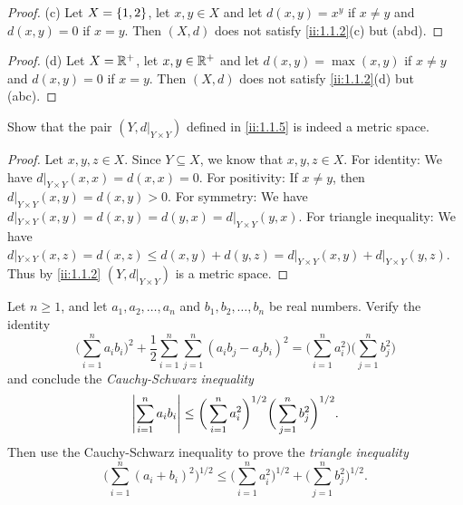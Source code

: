 \begin{proof}{(c)}
  Let \(X = \left\lbrace1, 2\right\rbrace\), let \(x, y \in X\) and let \(d(x, y) = x^y\) if \(x \neq y\) and \(d(x, y) = 0\) if \(x = y\).
  Then \((X, d)\) does not satisfy \cref{ii:1.1.2}(c) but (abd).
\end{proof}

\begin{proof}{(d)}
  Let \(X = \mathbb{R}^+\), let \(x, y \in \mathbb{R}^+\) and let \(d(x, y) = \max(x, y)\) if \(x \neq y\) and \(d(x, y) = 0\) if \(x = y\).
  Then \((X, d)\) does not satisfy \cref{ii:1.1.2}(d) but (abc).
\end{proof}

\begin{ex}\label{ii:ex:1.1.4}
  Show that the pair \((Y, d|_{Y \times Y})\) defined in \cref{ii:1.1.5} is indeed a metric space.
\end{ex}

\begin{proof}
  Let \(x, y, z \in X\).
  Since \(Y \subseteq X\), we know that \(x, y, z \in X\).
  For identity:
  We have \(d|_{Y \times Y}(x, x) = d(x, x) = 0\).
  For positivity:
  If \(x \neq y\), then \(d|_{Y \times Y}(x, y) = d(x, y) > 0\).
  For symmetry:
  We have \(d|_{Y \times Y}(x, y) = d(x, y) = d(y, x) = d|_{Y \times Y}(y, x)\).
  For triangle inequality:
  We have \(d|_{Y \times Y}(x, z) = d(x, z) \leq d(x, y) + d(y, z) = d|_{Y \times Y}(x, y) + d|_{Y \times Y}(y, z)\).
  Thus by \cref{ii:1.1.2} \((Y, d|_{Y \times Y})\) is a metric space.
\end{proof}

\begin{ex}\label{ii:ex:1.1.5}
  Let \(n \geq 1\), and let \(a_1, a_2, \dots, a_n\) and \(b_1, b_2, \dots, b_n\) be real numbers.
  Verify the identity
  \[
    \bigg(\sum_{i = 1}^n a_i b_i\bigg)^2 + \dfrac{1}{2} \sum_{i = 1}^n \sum_{j = 1}^n (a_i b_j - a_j b_i)^2 = \bigg(\sum_{i = 1}^n a_i^2\bigg) \bigg(\sum_{j = 1}^n b_j^2\bigg)
  \]
  and conclude the \emph{Cauchy-Schwarz inequality}
  \[
    \left\lvert\sum_{i = 1}^n a_i b_i\right\rvert \leq \bigg(\sum_{i = 1}^n a_i^2\bigg)^{1 / 2} \bigg(\sum_{j = 1}^n b_j^2\bigg)^{1 / 2}.
  \]
  Then use the Cauchy-Schwarz inequality to prove the \emph{triangle inequality}
  \[
    \bigg(\sum_{i = 1}^n (a_i + b_i)^2\bigg)^{1 / 2} \leq \bigg(\sum_{i = 1}^n a_i^2\bigg)^{1 / 2} + \bigg(\sum_{j = 1}^n b_j^2\bigg)^{1 / 2}.
  \]
\end{ex}

